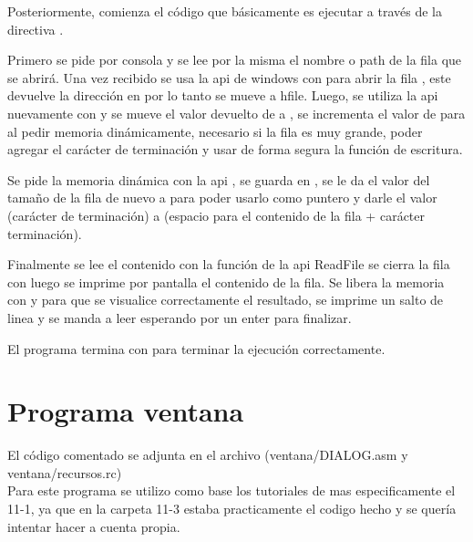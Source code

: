 \vspace{0.5cm}

Posteriormente, comienza el código que básicamente es ejecutar 
a través de la directiva .


Primero se pide por consola y se lee por la misma el nombre o path de la fila
que se abrirá. Una vez recibido se usa la api de windows con  para
abrir la fila \Cite{MicrosoftCreateFileA}, este devuelve la dirección en 
por lo tanto se mueve a hfile. Luego, se utiliza la api nuevamente con 
\Cite{Windowsgetsize} y se mueve el valor devuelto de  a
, se incrementa el valor de  para al pedir
memoria dinámicamente, necesario si la fila es muy grande, poder agregar el
carácter de terminación y usar de forma segura la función de escritura.


Se pide la memoria dinámica con la api  \Cite{GlobalAlloc},
se guarda en , se le da el valor del tamaño de la fila de nuevo a
 para poder usarlo como puntero y darle el valor 
(carácter de terminación) a  (espacio para el contenido de la
fila + carácter terminación).


Finalmente se lee el contenido con la función de la api ReadFile
\Cite{MicrosoftReadFile} se cierra la fila con 
\Cite{CloseHandle}
luego se imprime por pantalla el contenido de la fila. Se libera la memoria con
 y para que se visualice correctamente el resultado, se
imprime un salto de linea y se manda a leer esperando por un enter para finalizar.


El programa termina con  para terminar la ejecución
correctamente.





\section{Programa ventana}

El código comentado se adjunta en el archivo
(ventana/DIALOG.asm y ventana/recursos.rc)\\


Para este programa se utilizo como base los tutoriales de 
\Cite{Iczelion}
mas especificamente el 11-1, ya que en la carpeta 11-3 estaba practicamente el
codigo hecho y se quería intentar hacer a cuenta propia.


